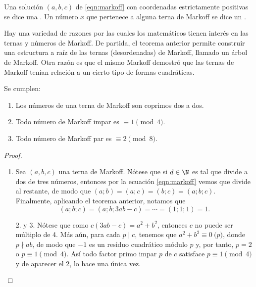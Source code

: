 \documentclass[teoria-numeros.tex]{subfiles}
\begin{document}
\begin{mydef}
	Una solución $(a, b, c)$ de \eqref{eqn:markoff} con coordenadas estrictamente positivas se dice una .
	Un número $x$ que pertenece a alguna terna de Markoff se dice un .
\end{mydef}
Hay una variedad de razones por las cuales los matemáticos tienen interés en las ternas y números de Markoff.
De partida, el teorema anterior permite construir una estructura a raíz de las ternas (desordenadas) de Markoff, llamado un árbol de Markoff.
Otra razón es que el mismo Markoff demostró que las ternas de Markoff tenían relación a un cierto tipo de formas cuadráticas.

\begin{thm}[Frobenius]
	Se cumplen:
	\begin{enumerate}
		\item Los números de una terna de Markoff son coprimos dos a dos.
		\item Todo número de Markoff impar es $\equiv 1 \pmod 4$.
		\item Todo número de Markoff   par es $\equiv 2 \pmod 8$.
	\end{enumerate}
\end{thm}
\begin{proof}
	\begin{enumerate}
		\item Sea $(a, b, c)$ una terna de Markoff.
			Nótese que si $d \in \N$ es tal que divide a dos de tres números, entonces por la ecuación \eqref{eqn:markoff}
			vemos que divide al restante, de modo que $(a; b) = (a; c) = (b; c) = (a; b; c)$.
			Finalmente, aplicando el teorema anterior, notamos que
			$$ (a; b; c) = (a; b; 3ab - c) = \cdots = (1; 1; 1) = 1. $$
		\item[2. y 3.] Nótese que como $c(3ab - c) = a^2 + b^2$, entonces $c$ no puede ser múltiplo de 4.
			Más aún, para cada $p \mid c$, tenemos que $a^2 + b^2 \equiv 0 \pod p$, donde $p \nmid ab$,
			de modo que $-1$ es un residuo cuadrático módulo $p$ y, por tanto, $p = 2$ o $p \equiv 1 \pmod 4$.
			Así todo factor primo impar $p$ de $c$ satisface $p \equiv 1\pmod 4$ y de aparecer el 2, lo hace una única vez.  \qedhere
	\end{enumerate}
\end{proof}
\end{document}

